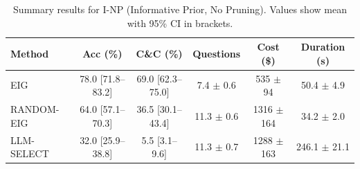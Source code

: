 \begin{table}[htbp]
\centering
\small
\caption{Summary results for I-NP (Informative Prior, No Pruning). Values show mean with 95\% CI in brackets.}
\label{tab:results-notprune_notuniform}
\begin{tabular}{@{}lccccc@{}}
\toprule
Method & Acc (\%) & C\&C (\%) & Questions & Cost (\$) & Duration (s) \\
\midrule
EIG & 78.0 [71.8--83.2] & 69.0 [62.3--75.0] & 7.4 $\pm$ 0.6 & 535 $\pm$ 94 & 50.4 $\pm$ 4.9 \\
RANDOM-EIG & 64.0 [57.1--70.3] & 36.5 [30.1--43.4] & 11.3 $\pm$ 0.6 & 1316 $\pm$ 164 & 34.2 $\pm$ 2.0 \\
LLM-SELECT & 32.0 [25.9--38.8] & 5.5 [3.1--9.6] & 11.3 $\pm$ 0.7 & 1288 $\pm$ 163 & 246.1 $\pm$ 21.1 \\
\bottomrule
\end{tabular}
\end{table}